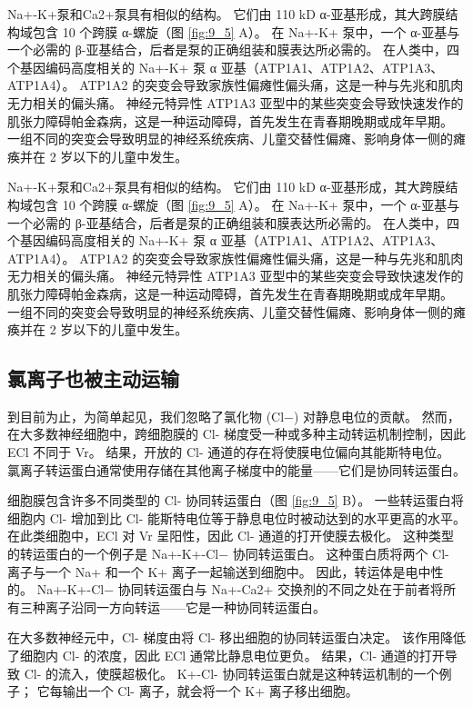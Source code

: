 Na+-K+泵和Ca2+泵具有相似的结构。 
它们由 110 kD α-亚基形成，其大跨膜结构域包含 10 个跨膜 α-螺旋（图 \ref{fig:9_5} A）。 
在 Na+-K+ 泵中，一个 α-亚基与一个必需的 β-亚基结合，后者是泵的正确组装和膜表达所必需的。 
在人类中，四个基因编码高度相关的 Na+-K+ 泵 α 亚基（ATP1A1、ATP1A2、ATP1A3、ATP1A4）。 
ATP1A2 的突变会导致家族性偏瘫性偏头痛，这是一种与先兆和肌肉无力相关的偏头痛。 
神经元特异性 ATP1A3 亚型中的某些突变会导致快速发作的肌张力障碍帕金森病，这是一种运动障碍，首先发生在青春期晚期或成年早期。 
一组不同的突变会导致明显的神经系统疾病、儿童交替性偏瘫、影响身体一侧的瘫痪并在 2 岁以下的儿童中发生。


Na+-K+泵和Ca2+泵具有相似的结构。 
它们由 110 kD α-亚基形成，其大跨膜结构域包含 10 个跨膜 α-螺旋（图 \ref{fig:9_5} A）。 
在 Na+-K+ 泵中，一个 α-亚基与一个必需的 β-亚基结合，后者是泵的正确组装和膜表达所必需的。 
在人类中，四个基因编码高度相关的 Na+-K+ 泵 α 亚基（ATP1A1、ATP1A2、ATP1A3、ATP1A4）。 ATP1A2 的突变会导致家族性偏瘫性偏头痛，这是一种与先兆和肌肉无力相关的偏头痛。 
神经元特异性 ATP1A3 亚型中的某些突变会导致快速发作的肌张力障碍帕金森病，这是一种运动障碍，首先发生在青春期晚期或成年早期。 
一组不同的突变会导致明显的神经系统疾病、儿童交替性偏瘫、影响身体一侧的瘫痪并在 2 岁以下的儿童中发生。



\subsection{氯离子也被主动运输}
到目前为止，为简单起见，我们忽略了氯化物 (Cl−) 对静息电位的贡献。 
然而，在大多数神经细胞中，跨细胞膜的 Cl- 梯度受一种或多种主动转运机制控制，因此 ECl 不同于 Vr。 
结果，开放的 Cl- 通道的存在将使膜电位偏向其能斯特电位。 
氯离子转运蛋白通常使用存储在其他离子梯度中的能量——它们是协同转运蛋白。


细胞膜包含许多不同类型的 Cl- 协同转运蛋白（图 \ref{fig:9_5} B）。 
一些转运蛋白将细胞内 Cl- 增加到比 Cl- 能斯特电位等于静息电位时被动达到的水平更高的水平。 
在此类细胞中，ECl 对 Vr 呈阳性，因此 Cl- 通道的打开使膜去极化。 
这种类型的转运蛋白的一个例子是 Na+-K+-Cl− 协同转运蛋白。 
这种蛋白质将两个 Cl- 离子与一个 Na+ 和一个 K+ 离子一起输送到细胞中。 
因此，转运体是电中性的。 
Na+-K+-Cl− 协同转运蛋白与 Na+-Ca2+ 交换剂的不同之处在于前者将所有三种离子沿同一方向转运——它是一种协同转运蛋白。


在大多数神经元中，Cl- 梯度由将 Cl- 移出细胞的协同转运蛋白决定。 
该作用降低了细胞内 Cl- 的浓度，因此 ECl 通常比静息电位更负。 
结果，Cl- 通道的打开导致 Cl- 的流入，使膜超极化。 
K+-Cl- 协同转运蛋白就是这种转运机制的一个例子； 它每输出一个 Cl- 离子，就会将一个 K+ 离子移出细胞。


